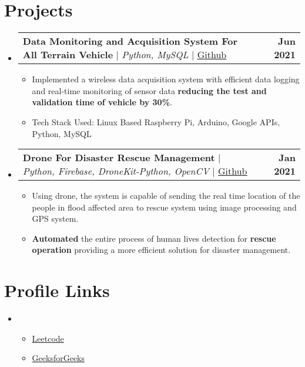 \documentclass[letterpaper,11pt]{article}
\makeatletter
\newcommand{\resumeItem}[1]{
  \item\small{
	{#1 \vspace{-2pt}}
  }
}
\newcommand{\resumeProjectHeading}[2]{
	\item
	\begin{tabular*}{1.001\textwidth}{l@{\extracolsep{\fill}}r}
  	\small#1 & \textbf{\small #2}\\
	\end{tabular*}\vspace{-7pt}
}
\newcommand{\resumeSubHeadingListStart}{\begin{itemize}[leftmargin=0.0in, label={}]}
\newcommand{\resumeSubHeadingListEnd}{\end{itemize}}
\newcommand{\resumeItemListStart}{\begin{itemize}}
\newcommand{\resumeItemListEnd}{\end{itemize}\vspace{-5pt}}
\makeatother
\begin{document}
\section{Projects}
	\vspace{-5pt}
	\resumeSubHeadingListStart
	\resumeProjectHeading
      	{\textbf{Data Monitoring and Acquisition System For All Terrain Vehicle} $|$ \emph{Python, MySQL} $|$ {{\href{https://github.com/MasterZesty/}{\underline{Github}}}}}{Jun 2021}
      	\resumeItemListStart
        	\resumeItem{Implemented a wireless data acquisition system with efficient data logging and real-time monitoring of sensor data \textbf{reducing the test and validation time of vehicle by 30\%}.}
        	\resumeItem{Tech Stack Used: Linux Based Raspberry Pi, Arduino, Google APIs, Python, MySQL}
      	\resumeItemListEnd
	\vspace{-13pt}
  	\resumeProjectHeading
      	{\textbf{Drone For Disaster Rescue Management} $|$ \emph{Python, Firebase, DroneKit-Python, OpenCV}  $|$ {{\href{https://github.com/MasterZesty/}{\underline{Github}}}}}{Jan 2021}
      	\resumeItemListStart
        	\resumeItem{Using drone, the system is capable of sending the real time location of the people in flood affected area to rescue system using image processing and GPS system.}
        	\resumeItem{\textbf{Automated} the entire process of human lives detection for \textbf{rescue operation} providing a more efficient solution for disaster management.}
      	\resumeItemListEnd
	\resumeSubHeadingListEnd
\vspace{-15pt}


%
\section{Profile Links}
 \begin{itemize}[leftmargin=0.15in, label={}]
 \item
	\resumeItemListStart
    	\resumeItem {\href{https://leetcode.com/KrishnaNimbalkar/}{Leetcode}}
    	\resumeItem {\href{https://auth.geeksforgeeks.org/user/kgn272000/profile}{GeeksforGeeks}}
  	\resumeItemListEnd
 \end{itemize}
 \vspace{-16pt}


%
\end{document}
